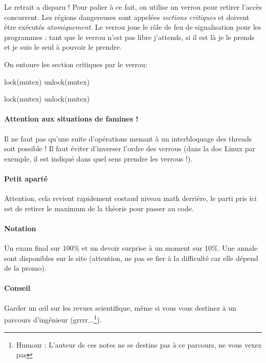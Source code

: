 \documentclass{article}
\begin{document}
Le retrait a disparu ! Pour palier à ce fait, on utilise un verrou pour retirer l'accès concurrent. Les régions dangereuses sont appelées \emph{sections critiques} et doivent être exécutés \emph{atomiquement}. Le verrou joue le rôle de feu de signalisation pour les programmes : tant que le verrou n'est pas libre j'attends, si il est là je le prends et je suis le seul à pouvoir le prendre.

On entoure les section critiques par le verrou:
\begin{algorithm}
lock(mutex) 
unlock(mutex)\;
\end{algorithm}

\begin{algorithm}
lock(mutex) 
unlock(mutex)\;
\end{algorithm}

\paragraph{Attention aux situations de famines !} Il ne faut pas qu'une suite d'opérations menant à un interbloquage des threads soit possible ! Il faut éviter d'inverser l'ordre des verrous (dans la doc Linux par exemple, il est indiqué dans quel sens prendre les verrous !).


\paragraph{Petit aparté} Attention, cela revient rapidement costaud niveau math derrière, le parti pris ici est de retirer le maximum de la théorie pour passer au code.

\paragraph{Notation} Un exam final sur 100\% et un devoir surprise à un moment sur 10\%. Une annale sont disponibles sur le site (attention, ne pas se fier à la difficulté car elle dépend de la promo).

\paragraph{Conseil} Garder un œil sur les revues scientifique, même si vous vous destinez à un parcours d'ingénieur (grrrr...\footnote{Humour : L'auteur de ces notes ne se destine pas à ce parcours, ne vous vexez pas}).
\end{document}
